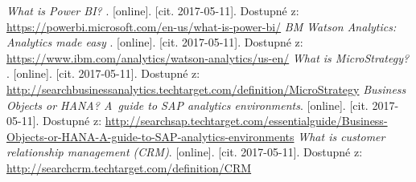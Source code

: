 \begin{thebibliography}{99}
\textit{What is Power BI? }.
[online]. [cit. 2017-05-11]. Dostupné z:  \url{https://powerbi.microsoft.com/en-us/what-is-power-bi/}
\textit{BM Watson Analytics: Analytics made easy }.
[online]. [cit. 2017-05-11]. Dostupné z: \url{https://www.ibm.com/analytics/watson-analytics/us-en/}
\textit{What is MicroStrategy? }.
[online]. [cit. 2017-05-11]. Dostupné z: \url{http://searchbusinessanalytics.techtarget.com/definition/MicroStrategy}
\textit{Business Objects or HANA? A~guide to SAP analytics environments}.
[online]. [cit. 2017-05-11]. Dostupné z: \url{http://searchsap.techtarget.com/essentialguide/Business-Objects-or-HANA-A-guide-to-SAP-analytics-environments}
\textit{What is customer relationship management (CRM)}.
[online]. [cit. 2017-05-11]. Dostupné z: \url{http://searchcrm.techtarget.com/definition/CRM}
\label{LastPage}
\end{thebibliography}
